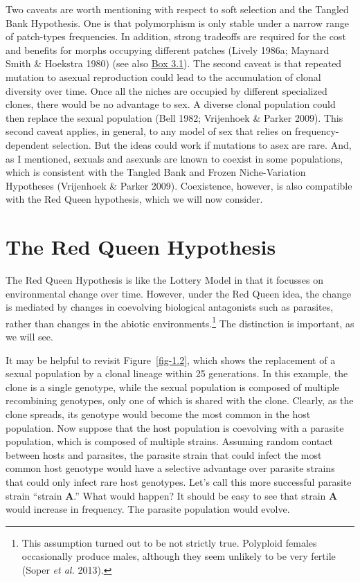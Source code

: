 \documentclass[
  letterpaper,
]{book}
\begin{document}
Two caveats are worth mentioning with respect to soft selection and the
Tangled Bank Hypothesis. One is that polymorphism is only stable under a
narrow range of patch-types frequencies. In addition, strong tradeoffs
are required for the cost and benefits for morphs occupying different
patches (Lively 1986a; Maynard Smith \& Hoekstra 1980) (see also
\href{https://iulibscholcomm.github.io/through-the-looking-glass/eco-hyp-cont.html\#callout-4}{Box
3.1}). The second caveat is that repeated mutation to asexual
reproduction could lead to the accumulation of clonal diversity over
time. Once all the niches are occupied by different specialized clones,
there would be no advantage to sex. A diverse clonal population could
then replace the sexual population (Bell 1982; Vrijenhoek \& Parker
2009). This second caveat applies, in general, to any model of sex that
relies on frequency-dependent selection. But the ideas could work if
mutations to asex are rare. And, as I mentioned, sexuals and asexuals
are known to coexist in some populations, which is consistent with the
Tangled Bank and Frozen Niche-Variation Hypotheses (Vrijenhoek \& Parker
2009). Coexistence, however, is also compatible with the Red Queen
hypothesis, which we will now consider.

\section{The Red Queen Hypothesis}\label{the-red-queen-hypothesis}

The Red Queen Hypothesis is like the Lottery Model in that it focusses
on environmental change over time. However, under the Red Queen idea,
the change is mediated by changes in coevolving biological antagonists
such as parasites, rather than changes in the abiotic
environments.\footnote{This assumption turned out to be not strictly
  true. Polyploid females occasionally produce males, although they seem
  unlikely to be very fertile (Soper \emph{et al.} 2013).} The
distinction is important, as we will see.

It may be helpful to revisit Figure~\ref{fig-1.2}, which shows the
replacement of a sexual population by a clonal lineage within 25
generations. In this example, the clone is a single genotype, while the
sexual population is composed of multiple recombining genotypes, only
one of which is shared with the clone. Clearly, as the clone spreads,
its genotype would become the most common in the host population. Now
suppose that the host population is coevolving with a parasite
population, which is composed of multiple strains. Assuming random
contact between hosts and parasites, the parasite strain that could
infect the most common host genotype would have a selective advantage
over parasite strains that could only infect rare host genotypes. Let's
call this more successful parasite strain ``strain \textbf{A}.'' What
would happen? It should be easy to see that strain \textbf{A} would
increase in frequency. The parasite population would evolve.
\end{document}
